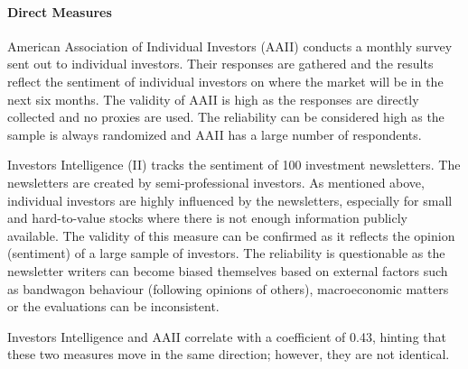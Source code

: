 \paragraph{Direct Measures}
American Association of Individual Investors (AAII) conducts a monthly survey sent out to individual investors. Their responses are gathered and the results reflect the sentiment of individual investors on where the market will be in the next six months. The validity of AAII is high as the responses are directly collected and no proxies are used. The reliability can be considered high as the sample is always randomized and AAII has a large number of respondents. 
\par
Investors Intelligence (II) tracks the sentiment of 100 investment newsletters. The newsletters are created by semi-professional investors. As mentioned above, individual investors are highly influenced by the newsletters, especially for small and hard-to-value stocks where there is not enough information publicly available. The validity of this measure can be confirmed as it reflects the opinion (sentiment) of a large sample of investors. The reliability is questionable as the newsletter writers can become biased themselves based on external factors such as bandwagon behaviour (following opinions of others), macroeconomic matters or the evaluations can be inconsistent.
\par
Investors Intelligence and AAII correlate with a coefficient of 0.43, hinting that these two measures move in the same direction; however, they are not identical.


